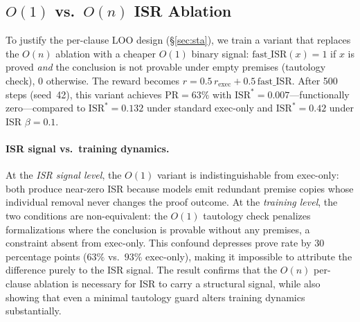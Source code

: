 \subsection{$O(1)$ vs.\ $O(n)$ ISR Ablation}
\label{app:o1-ablation}

To justify the per-clause LOO design (\S\ref{sec:sta}), we train a variant that replaces the $O(n)$ ablation with a cheaper $O(1)$ binary signal: $\text{fast\_ISR}(x) = 1$ if $x$ is proved \emph{and} the conclusion is not provable under empty premises (tautology check), $0$ otherwise.
The reward becomes $r = 0.5\,r_{\text{exec}} + 0.5\,\text{fast\_ISR}$.
After 500 steps (seed~42), this variant achieves $\text{PR}{=}63\%$ with $\text{ISR}^*{=}0.007$---functionally zero---compared to $\text{ISR}^*{=}0.132$ under standard exec-only and $\text{ISR}^*{=}0.42$ under ISR $\beta{=}0.1$.

\paragraph{ISR signal vs.\ training dynamics.}
At the \emph{ISR signal level}, the $O(1)$ variant is indistinguishable from exec-only: both produce near-zero ISR because models emit redundant premise copies whose individual removal never changes the proof outcome.
At the \emph{training level}, the two conditions are non-equivalent: the $O(1)$ tautology check penalizes formalizations where the conclusion is provable without any premises, a constraint absent from exec-only.
This confound depresses prove rate by 30 percentage points ($63\%$ vs.\ $93\%$ exec-only), making it impossible to attribute the difference purely to the ISR signal.
The result confirms that the $O(n)$ per-clause ablation is necessary for ISR to carry a structural signal, while also showing that even a minimal tautology guard alters training dynamics substantially.
